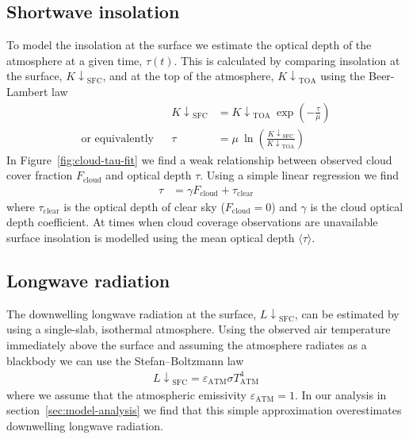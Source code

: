 \documentclass[a4paper,titlepage, twoside]{report}
\newcommand\Kdownsfc{{K\!\!\downarrow}_\mathrm{SFC}}
\newcommand\Kdowntoa{{K\!\!\downarrow}_\mathrm{TOA}}
\newcommand\Ldownsfc{{L\!\!\downarrow}_\mathrm{SFC}}
\begin{document}
\subsection{Shortwave insolation}
To model the insolation at the surface we estimate the optical depth of the atmosphere at a given time, $\tau(t)$.  This is calculated by comparing insolation at the surface, $\Kdownsfc$, and at the top of the atmosphere, $\Kdowntoa$ using the Beer-Lambert law \cite{stephens}
\begin{align}
&& \Kdownsfc &= \Kdowntoa\: \exp \left( -\frac{\tau}{\mu} \right) \\
\text{or equivalently} && \tau &= \mu \: \ln \left( \frac{\Kdownsfc}{\Kdowntoa} \right)
\end{align}
In Figure~\ref{fig:cloud-tau-fit} we find a weak relationship between observed cloud cover fraction $F_\mathrm{cloud}$ and optical depth $\tau$.  Using a simple linear regression we find
\begin{align}
\tau &= \gamma F_\mathrm{cloud} + \tau_\mathrm{clear}
\end{align}
where $\tau_\mathrm{clear}$ is the optical depth of clear sky ($F_\mathrm{cloud} = 0$) and $\gamma$ is the cloud optical depth coefficient.  At times when cloud coverage observations are unavailable surface insolation is modelled using the mean optical depth $\langle \tau \rangle$.  

\subsection{Longwave radiation}
The downwelling longwave radiation at the surface, $\Ldownsfc$, can be estimated by using a single-slab, isothermal atmosphere.  Using the observed air temperature immediately above the surface and assuming the atmosphere radiates as a blackbody we can use the Stefan--Boltzmann law \cite{ambaum} %
\begin{align}
\Ldownsfc = \varepsilon_\mathrm{ATM} \sigma T_\mathrm{ATM}^4 \label{eq:stefan-boltzmann}
\end{align}
where we assume that the atmospheric emissivity $\varepsilon_\mathrm{ATM} = 1$.  In our analysis in section~\ref{sec:model-analysis} we find that this simple approximation overestimates downwelling longwave radiation.
\end{document}
